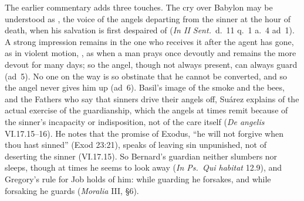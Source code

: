 The earlier commentary adds three touches. The cry over Babylon may be
understood as , the voice of the angels
departing from the sinner at the hour of death, when his salvation is first
despaired of (\emph{In II Sent.}\ d.~11 q.~1 a.~4 ad~1). A strong
impression remains in the one who receives it after the agent has gone, as
in violent motion, , as when a man prays once devoutly and
remains the more devout for many days; so the angel, though not always
present, can always guard (ad~5). No one on the way is so obstinate that he
cannot be converted, and so the angel never gives him up (ad~6). Basil's image of the smoke
and the bees, and the Fathers who say that sinners drive their angels off,
Suárez explains of the actual exercise of the guardianship, which the angels
at times remit because of the sinner's incapacity or indisposition, not of
the care itself (\emph{De angelis} VI.17.15--16). He notes that the promise
of Exodus, ``he will not forgive when thou hast sinned'' (Exod 23:21), speaks
of leaving sin unpunished, not of deserting the sinner (VI.17.15). So
Bernard's guardian neither slumbers nor sleeps, though at times he seems to
look away (\emph{In Ps.\ Qui habitat} 12.9), and Gregory's rule for Job holds
of him: while guarding he forsakes, and while forsaking he guards
(\emph{Moralia} III, \S6).

